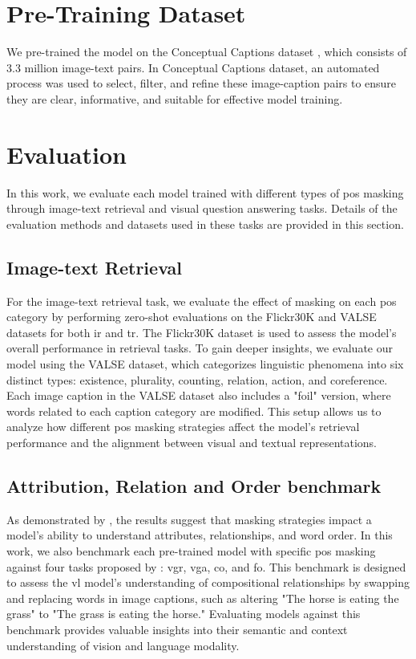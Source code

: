 \section{Pre-Training Dataset}
We pre-trained the model on the Conceptual Captions dataset \cite{conceptual-caption}, which consists of 3.3 million image-text pairs. 
In Conceptual Captions dataset, an automated process was used to select, filter, and refine these image-caption pairs to ensure they are clear, informative, and suitable for effective model training.

\section{Evaluation}
In this work, we evaluate each model trained with different types of \acrshort{pos} masking through image-text retrieval and visual question answering tasks. 
Details of the evaluation methods and datasets used in these tasks are provided in this section.

\subsection{Image-text Retrieval}
For the image-text retrieval task, we evaluate the effect of masking on each \acrshort{pos} category by performing zero-shot evaluations on the Flickr30K \cite{flickr30k} and VALSE \cite{valse} datasets for both \acrfull{ir} and \acrfull{tr}. 
The Flickr30K dataset is used to assess the model's overall performance in retrieval tasks. 
To gain deeper insights, we evaluate our model using the VALSE dataset, which categorizes linguistic phenomena into six distinct types: existence, plurality, counting, relation, action, and coreference.
Each image caption in the VALSE dataset also includes a "foil" version, where words related to each caption category are modified. 
This setup allows us to analyze how different \acrshort{pos} masking strategies affect the model's retrieval performance and the alignment between visual and textual representations.

\subsection{Attribution, Relation and Order benchmark}
As demonstrated by , the results suggest that masking strategies impact a model’s ability to understand attributes, relationships, and word order. 
In this work, we also benchmark each pre-trained model with specific \acrshort{pos} masking against four tasks proposed by : \acrfull{vgr}, \acrfull{vga}, \acrfull{co}, and \acrfull{fo}. 
This benchmark is designed to assess the \acrshort{vl} model’s understanding of compositional relationships by swapping and replacing words in image captions, such as altering "The horse is eating the grass" to "The grass is eating the horse." 
Evaluating models against this benchmark provides valuable insights into their semantic and context understanding of vision and language modality.


